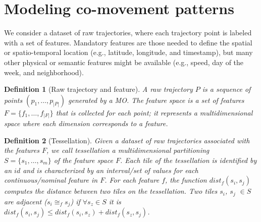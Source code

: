 \documentclass[preprint,12pt,authoryear]{elsarticle} %
\newtheorem{definition}{Definition}
\begin{document}
\section{Modeling co-movement patterns}\label{sec:modeling}
We consider a dataset of raw trajectories, where each trajectory point is labeled with a set of features.
Mandatory features are those needed to define the spatial or spatio-temporal location (e.g., latitude, longitude, and timestamp), but many other physical or semantic features might be available (e.g., speed, day of the week, and neighborhood).

\begin{definition}[Raw trajectory and feature] 
A \textit{raw trajectory} $P$ is a sequence of points $(p_1, \ldots, p_{|P|})$ generated by a MO. 
The \textit{feature space} is a set of features $F=\{f_1,\ldots,f_{|F|}\}$ that is collected for each point; it represents a multidimensional space where each dimension corresponds to a feature.
\end{definition}

\begin{definition}[Tessellation] 
Given a dataset of raw trajectories associated with the features $F$, we call \textit{tessellation} a multidimensional partitioning $S = \{s_1, \ldots, s_m\}$ of the feature space $F$.
Each \textit{tile} of the tessellation is identified by an $id$ and is characterized by an interval/set of values for each continuous/nominal feature in $F$.
For each feature $f$, the function $dist_f(s_i, s_j)$ computes the distance between two tiles on the tessellation.
Two tiles $s_i$, $s_j$ $\in S$ are  \textit{adjacent} ($s_i \cong_{f} s_j$) if $\forall s_z \in S$ it is $dist_f(s_i,s_j)\leq dist_f(s_i,s_z) + dist_f(s_z,s_j)$.
\end{definition}
\end{document}
